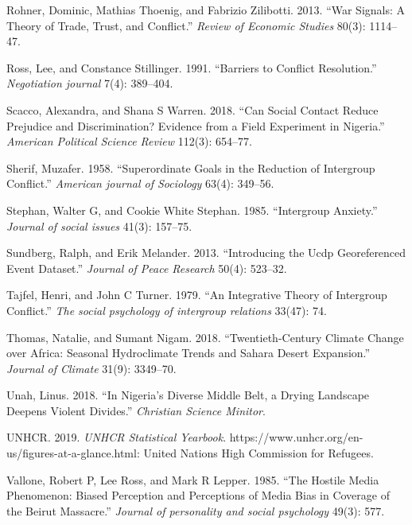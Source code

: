 \documentclass[11pt]{article}
\begin{document}
\leavevmode\hypertarget{ref-rohner2013war}{}%
Rohner, Dominic, Mathias Thoenig, and Fabrizio Zilibotti. 2013. ``War
Signals: A Theory of Trade, Trust, and Conflict.'' \emph{Review of
Economic Studies} 80(3): 1114--47.

\leavevmode\hypertarget{ref-ross1991barriers}{}%
Ross, Lee, and Constance Stillinger. 1991. ``Barriers to Conflict
Resolution.'' \emph{Negotiation journal} 7(4): 389--404.

\leavevmode\hypertarget{ref-scacco2018nigeria}{}%
Scacco, Alexandra, and Shana S Warren. 2018. ``Can Social Contact Reduce
Prejudice and Discrimination? Evidence from a Field Experiment in
Nigeria.'' \emph{American Political Science Review} 112(3): 654--77.

\leavevmode\hypertarget{ref-sherif1958superordinate}{}%
Sherif, Muzafer. 1958. ``Superordinate Goals in the Reduction of
Intergroup Conflict.'' \emph{American journal of Sociology} 63(4):
349--56.

\leavevmode\hypertarget{ref-stephan1985intergroup}{}%
Stephan, Walter G, and Cookie White Stephan. 1985. ``Intergroup
Anxiety.'' \emph{Journal of social issues} 41(3): 157--75.

\leavevmode\hypertarget{ref-ucdp}{}%
Sundberg, Ralph, and Erik Melander. 2013. ``Introducing the Ucdp
Georeferenced Event Dataset.'' \emph{Journal of Peace Research} 50(4):
523--32.

\leavevmode\hypertarget{ref-tajfel1979integrative}{}%
Tajfel, Henri, and John C Turner. 1979. ``An Integrative Theory of
Intergroup Conflict.'' \emph{The social psychology of intergroup
relations} 33(47): 74.

\leavevmode\hypertarget{ref-thomas2018sahara}{}%
Thomas, Natalie, and Sumant Nigam. 2018. ``Twentieth-Century Climate
Change over Africa: Seasonal Hydroclimate Trends and Sahara Desert
Expansion.'' \emph{Journal of Climate} 31(9): 3349--70.

\leavevmode\hypertarget{ref-unah2018nigeria}{}%
Unah, Linus. 2018. ``In Nigeria's Diverse Middle Belt, a Drying
Landscape Deepens Violent Divides.'' \emph{Christian Science Minitor}.

\leavevmode\hypertarget{ref-unhcr2019}{}%
UNHCR. 2019. \emph{UNHCR Statistical Yearbook}.
https://www.unhcr.org/en-us/figures-at-a-glance.html: United Nations
High Commission for Refugees.

\leavevmode\hypertarget{ref-vallone1985hostileMedia}{}%
Vallone, Robert P, Lee Ross, and Mark R Lepper. 1985. ``The Hostile
Media Phenomenon: Biased Perception and Perceptions of Media Bias in
Coverage of the Beirut Massacre.'' \emph{Journal of personality and
social psychology} 49(3): 577.
\end{document}
